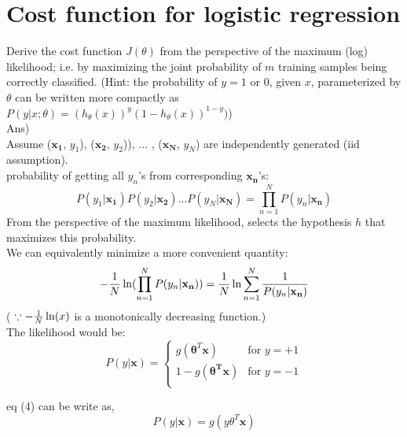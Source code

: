 \documentclass[12pt]{article}%
\begin{document}
\section{Cost function for logistic regression}
Derive the cost function $J(\theta)$ from the perspective of the maximum (log) likelihood; i.e. by maximizing the joint probability of $m$ training samples being correctly classified. (Hint: the probability of $y=1$ or $0$, given $x$, parameterized by $\theta$ can be written more compactly as $P(y | x; \theta) = (h_\theta (x))^y (1 - h_\theta (x))^{1-y} )$)\\

Ans)\\
Assume ($\mathbf{x_1}$, $y_1$), ($\mathbf{x_2}$, $y_2$)), $...$ , ($\mathbf{x_N}$, $y_N$) are independently generated (iid assumption).\\
probability of getting all $y_n$'s from corresponding $\mathbf{x_n}$'s:
\begin{equation}
	P(y_1 | \mathbf{x_1})P(y_2 | \mathbf{x_2}) ... P(y_N | \mathbf{x_N}) = \prod_{n=1}^{N} {P(y_n | \mathbf{x_n})}
\end{equation}
From the perspective of the maximum likelihood, selects the hypothesis $h$ that maximizes this probability.\\
We can equivalently minimize a more convenient quantity: 
\begin{equation}
	- {1 \over N} \ln (\prod_{n=1}^{N} {P(y_n | \mathbf{x_n})}) = {1 \over N} \ln \sum_{n=1}^{N} {1 \over P(y_n | \mathbf{x_n})}
\end{equation}
( $\because - {1 \over N} \ln(x)$ is a monotonically decreasing function.)\\
The likelihood would be:
\begin{equation}
	P(y | \mathbf{x}) = 
	\begin{cases}
		g(\mathbf{\theta}^T\mathbf{x}) & \text{for $y = +1$}\\
		1 - g(\mathbf{\theta^T}\mathbf{x}) & \text{for $y = -1$}\\
	\end{cases}
\end{equation}

eq (4) can be write as,
\begin{equation}
	P(y | \mathbf{x})=  g(y \theta^T \mathbf{x})
\end{equation}
\end{document}
